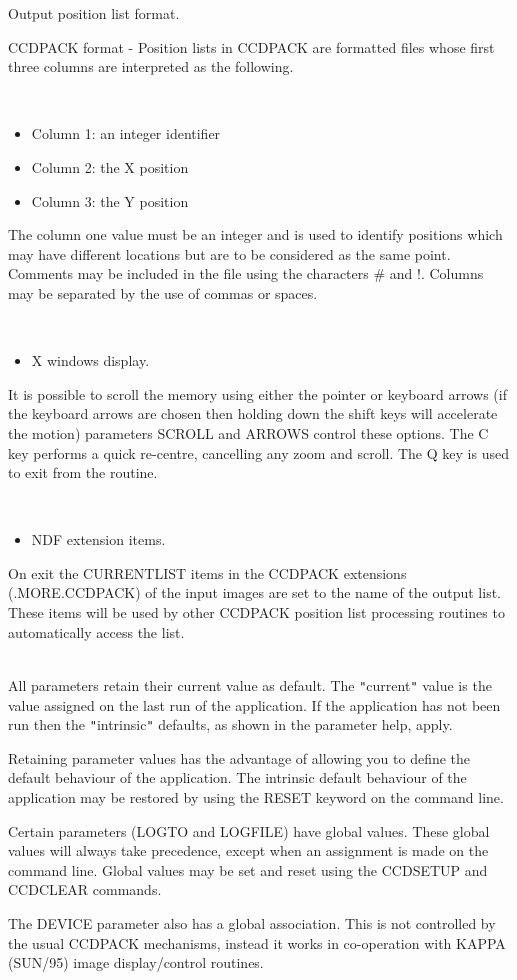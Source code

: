 \documentclass[twoside,11pt]{article}
\newcommand{\htmlref}[2]{#1}
\newcommand{\xref}[3]{#1}
\renewcommand{\_}{\texttt{\symbol{95}}}
\newcommand{\qt}[1]{{\tt "}#1{\tt "}}
\newcommand{\xroutine}[1]{\htmlref{{\sc #1}}{#1}}
\newcommand{\sstdiytopic}[2]{\item[#1:] \mbox{} \\[1.3ex] #2}
\newcommand{\sstitemlist}[1]{
  \mbox{} \\
  \vspace{-3.5ex}
  \begin{itemize}
     #1
  \end{itemize}
}
\newcommand{\sstitem}{\item}
\newcommand{\sstdiytopic}[2]{\item[{#1}] #2 }
\newcommand{\sstitemlist}[1]{
      \begin{itemize}
         #1
      \end{itemize}
      \\
   }
\newcommand{\sstitem}{\item}
\begin{document}
{{{         \sstitem
         Output position list format.

      }
        CCDPACK format - Position lists in CCDPACK are formatted files
        whose first three columns are interpreted as the following.

      \sstitemlist{

         \sstitem
              Column 1: an integer identifier

         \sstitem
              Column 2: the X position

         \sstitem
              Column 3: the Y position

      }
        The column one value must be an integer and is used to identify
        positions which may have different locations but are to be
        considered as the same point. Comments may be included in the
        file using the characters \# and !. Columns may be separated by
        the use of commas or spaces.

      \sstitemlist{

         \sstitem
         X windows display.

      }
        It is possible to scroll the memory using either the pointer or
        keyboard arrows (if the keyboard arrows are chosen then holding
        down the shift keys will accelerate the motion) parameters
        SCROLL and ARROWS control these options. The C key performs a
        quick re-centre, cancelling any zoom and scroll. The Q key
        is used to exit from the routine.

      \sstitemlist{

         \sstitem
         NDF extension items.

      }
        On exit the CURRENT\_LIST items in the CCDPACK extensions
        (.MORE.CCDPACK) of the input images are set to the name of the
        output list. These items will be used by other CCDPACK position
        list processing routines to automatically access the list.
   }
   \sstdiytopic{
      Behaviour of parameters
   }{
      All parameters retain their current value as default. The
      \qt{current} value is the value assigned on the last run of the
      application. If the application has not been run then the
      \qt{intrinsic} defaults, as shown in the parameter help, apply.

      Retaining parameter values has the advantage of allowing you to
      define the default behaviour of the application.  The intrinsic
      default behaviour of the application may be restored by using the
      RESET keyword on the command line.

      Certain parameters (LOGTO and LOGFILE) have global values. These
      global values will always take precedence, except when an
      assignment is made on the command line.  Global values may be set
      and reset using the \xroutine{CCDSETUP} and \xroutine{CCDCLEAR} commands.

      The DEVICE parameter also has a global association. This is not
      controlled by the usual CCDPACK mechanisms, instead it works in
      co-operation with \xref{KAPPA (SUN/95)}{sun95}{} image display/control routines.
   }
}
\end{document}

